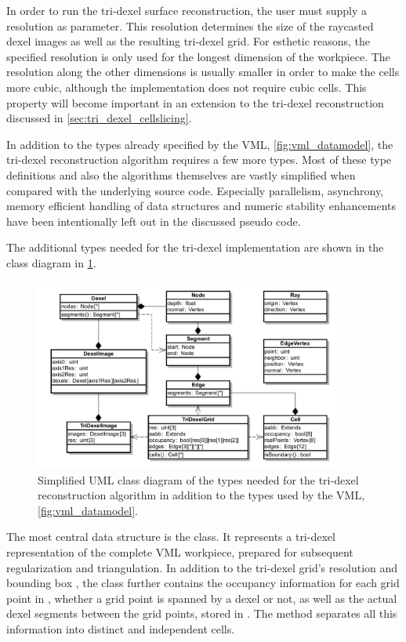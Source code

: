 In order to run the tri-dexel surface reconstruction, the user must supply a resolution as parameter.
This resolution determines the size of the raycasted dexel images as well as the resulting tri-dexel grid.
For esthetic reasons, the specified resolution is only used for the longest dimension of the workpiece.
The resolution along the other dimensions is usually smaller in order to make the cells more cubic, although the implementation does not require cubic cells.
This property will become important in an extension to the tri-dexel reconstruction discussed in \cref{sec:tri_dexel_cellslicing}.


In addition to the types already specified by the VML, \cf \cref{fig:vml_datamodel}, the tri-dexel reconstruction algorithm requires a few more types.
Most of these type definitions and also the algorithms themselves are vastly simplified when compared with the underlying source code.
Especially parallelism, asynchrony, memory efficient handling of data structures and numeric stability enhancements have been intentionally left out in the discussed pseudo code.


The additional types needed for the tri-dexel implementation are shown in the class diagram in \cref{fig:tri_dexel_datamodel}.
%
\begin{figure}
	\centering
	\includegraphics[width=0.9\textwidth]{images/tri_dexel_datamodel}
	\caption{
		Simplified UML class diagram of the types needed for the tri-dexel reconstruction algorithm in addition to the types used by the VML, \cf \cref{fig:vml_datamodel}.
	}
	\label{fig:tri_dexel_datamodel}
\end{figure}
%
The most central data structure is the  class.
It represents a tri-dexel representation of the complete VML workpiece, prepared for subsequent regularization and triangulation.
In addition to the tri-dexel grid's resolution  and bounding box , the  class further contains the occupancy information for each grid point in , \ie whether a grid point is spanned by a dexel or not, as well as the actual dexel segments between the grid points, stored in .
The  method separates all this information into distinct and independent cells.

